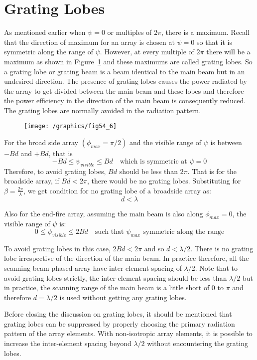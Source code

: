 \section{Grating Lobes}
As mentioned earlier when $\psi = 0 $ or multiples of $2\pi$, there is a maximum. Recall that the direction of maximum for an array is chosen at $\psi = 0$ so that it is symmetric along the range of $\psi$. However, at every multiple of $2\pi$ there will be a maximum as shown in Figure~\ref{54.9} and these maximums are called grating lobes. So a grating lobe or grating beam is a beam identical to the main beam but in an undesired direction. The presence of grating lobes causes the power radiated by the array to get divided between the main beam and these lobes and therefore the power efficiency in the direction of the main beam is consequently reduced. The grating lobes are normally avoided in the radiation pattern.
\begin{figure}[h]
\texttt{[image: /graphics/fig54\_6]}
\centering
\caption{}
\label{54.9}
\end{figure}

For the broad side array $(\phi_{max} = \pi/2)$ and the visible range of $\psi$ is between $-Bd$ and $+Bd$, that is
$$
-Bd \leq \psi_{visible} \leq Bd \quad \text{which is symmetric at $\psi =0$}
$$
Therefore, to avoid grating lobes, $Bd$ should be less than $2\pi$. That is for the broadside array, if $Bd < 2\pi$, there would be no grating lobes. Substituting for $\beta = \frac{2\pi}{\lambda}$, we get condition for no grating lobe of a broadside array as:
$$d < \lambda $$

Also for the end-fire array, assuming the main beam is also along $\phi_{max} = 0$, the visible range of $\psi$ is:
$$
0 \leq \psi_{visible} \leq 2Bd \quad \text{such that $\psi_{max}$ symmetric along the range}
$$

To avoid grating lobes in this case, $2Bd < 2 \pi$ and so $d < \lambda/2$. There is no grating lobe irrespective of the direction of the main beam. In practice therefore, all the scanning beam phased array have inter-element spacing of $\lambda /2$. Note that to avoid grating lobes strictly, the inter-element spacing should be less than $\lambda / 2$ but in practice, the scanning range of the main beam is a little short of $0$ to $\pi$ and therefore $d=\lambda/2$ is used without getting any grating lobes.

Before closing the discussion on grating lobes, it should be mentioned that grating lobes can be suppressed by properly choosing the primary radiation pattern of the array elements. With  non-isotropic array elements, it is possible to increase the inter-element spacing beyond $\lambda/2$ without encountering the grating lobes.